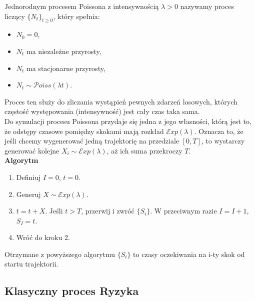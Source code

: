 \documentclass[12pt]{mwart}
\begin{document}
	\noindent Jednorodnym procesem Poissona z intensywnością $\lambda > 0$ nazywamy proces liczący $\{N_t\}_{t \geq 0}$, który spełnia:
	\begin{itemize}
		\item $N_0 = 0$,
		\item $N_t$ ma niezależne przyrosty,
		\item $N_t$ ma stacjonarne przyrosty,
		\item $N_t \sim \mathcal{P}oiss(\lambda t)$.
	\end{itemize}
	Proces ten służy do zliczania wystąpień pewnych zdarzeń losowych, których częstość występowania (intensywność) jest cały czas taka sama.\\
	
	\noindent Do symulacji procesu Poissona przydaje się jedna z jego własności, którą jest to, że odstępy czasowe pomiędzy skokami mają rozkład $\mathcal{E}xp(\lambda)$.
	Oznacza to, że jeśli chcemy wygenerować jedną trajektorię na przedziale $[0, T]$, to wystarczy generować kolejne $X_i \sim \mathcal{E}xp(\lambda)$, aż ich suma przekroczy $T$.\\
	
	\noindent \textbf{Algorytm}
	\begin{enumerate}
		\item Definiuj $I = 0$, $t=0$.
		\item Generuj $X \sim \mathcal{E}xp(\lambda)$.
		\item $t = t + X$. Jeśli $t > T$, przerwij i zwróć $\{S_i\}$. W przeciwnym razie $I = I + 1$, $S_I = t$.
		\item Wróć do kroku 2.
	\end{enumerate}
	Otrzymane z powyższego algorytmu $\{S_i\}$ to czasy oczekiwania na i-ty skok od startu trajektorii.
	
	
	
	\subsection{Klasyczny proces Ryzyka}
	
\end{document}
